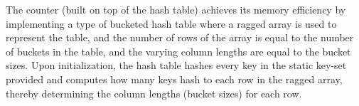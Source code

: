 The counter (built on top of the hash table) achieves its memory efficiency by implementing a type of bucketed hash table where a ragged array is used to represent the table, and the number of rows of the array is equal to the number of buckets in the table, and the varying column lengths are equal to the bucket sizes.
Upon initialization, the hash table hashes every key in the static key-set provided and computes how many keys hash to each row in the ragged array, thereby determining the column lengths (bucket sizes) for each row.
